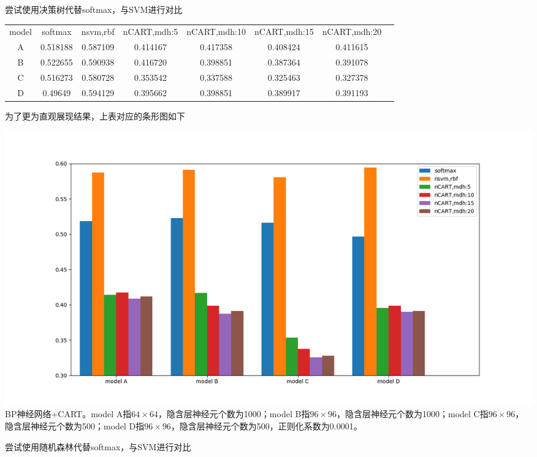尝试使用决策树代替softmax，与SVM进行对比
\begin{center}
\begin{tabular}{cccccccc}
\toprule[2pt]
model  & softmax & nsvm,rbf & nCART,mdh:5 & nCART,mdh:10 & nCART,mdh:15 & nCART,mdh:20\\ 
A & 0.518188 & 0.587109 & 0.414167 & 0.417358 & 0.408424 & 0.411615\\ 
B & 0.522655 & 0.590938 & 0.416720 & 0.398851 & 0.387364 & 0.391078\\ 
C & 0.516273 & 0.580728 & 0.353542 & 0.337588 & 0.325463 & 0.327378\\ 
D & 0.49649 & 0.594129 & 0.395662 & 0.398851 & 0.389917 & 0.391193\\ 
\bottomrule[2pt]
\end{tabular} 
\end{center}


为了更为直观展现结果，上表对应的条形图如下
\begin{center}
\includegraphics[scale=0.5]{../figures/NN_tree1.png} \\
BP神经网络+CART。model A指$64\times64$，隐含层神经元个数为1000；model B指$96\times96$，隐含层神经元个数为1000；model C指$96\times96$，隐含层神经元个数为500；model D指$96\times96$，隐含层神经元个数为500，正则化系数为0.0001。
\end{center}


尝试使用随机森林代替softmax，与SVM进行对比

